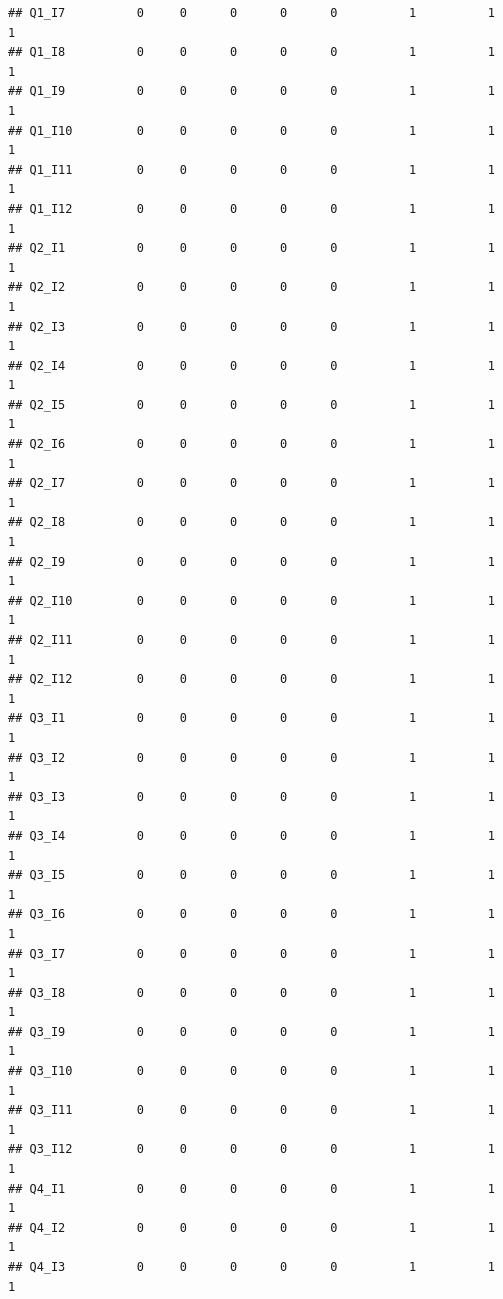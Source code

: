 \documentclass[
]{book}
\begin{document}
\begin{verbatim}
## Q1_I7          0     0      0      0      0          1          1          1
## Q1_I8          0     0      0      0      0          1          1          1
## Q1_I9          0     0      0      0      0          1          1          1
## Q1_I10         0     0      0      0      0          1          1          1
## Q1_I11         0     0      0      0      0          1          1          1
## Q1_I12         0     0      0      0      0          1          1          1
## Q2_I1          0     0      0      0      0          1          1          1
## Q2_I2          0     0      0      0      0          1          1          1
## Q2_I3          0     0      0      0      0          1          1          1
## Q2_I4          0     0      0      0      0          1          1          1
## Q2_I5          0     0      0      0      0          1          1          1
## Q2_I6          0     0      0      0      0          1          1          1
## Q2_I7          0     0      0      0      0          1          1          1
## Q2_I8          0     0      0      0      0          1          1          1
## Q2_I9          0     0      0      0      0          1          1          1
## Q2_I10         0     0      0      0      0          1          1          1
## Q2_I11         0     0      0      0      0          1          1          1
## Q2_I12         0     0      0      0      0          1          1          1
## Q3_I1          0     0      0      0      0          1          1          1
## Q3_I2          0     0      0      0      0          1          1          1
## Q3_I3          0     0      0      0      0          1          1          1
## Q3_I4          0     0      0      0      0          1          1          1
## Q3_I5          0     0      0      0      0          1          1          1
## Q3_I6          0     0      0      0      0          1          1          1
## Q3_I7          0     0      0      0      0          1          1          1
## Q3_I8          0     0      0      0      0          1          1          1
## Q3_I9          0     0      0      0      0          1          1          1
## Q3_I10         0     0      0      0      0          1          1          1
## Q3_I11         0     0      0      0      0          1          1          1
## Q3_I12         0     0      0      0      0          1          1          1
## Q4_I1          0     0      0      0      0          1          1          1
## Q4_I2          0     0      0      0      0          1          1          1
## Q4_I3          0     0      0      0      0          1          1          1

\end{verbatim}
\end{document}
